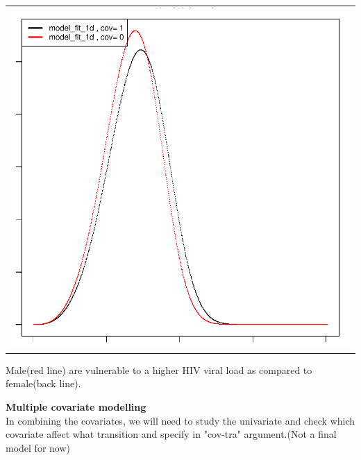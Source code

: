\documentclass[11pt,a4paper]{article}
\begin{document}
\begin{enumerate}
\begin{minipage}{0.45\textwidth}
\begin{tabular}{|p{\textwidth}}
\includegraphics{SemiMarkov_Paper-021}
\end{tabular}
\end{minipage}%
\end{enumerate}

Male(red line) are vulnerable to a higher HIV viral load as compared to female(back line). 


\textbf{Multiple covariate modelling}\\

In combining the covariates, we will need to study the univariate and check which covariate affect what transition and specify in "cov-tra" argument.(Not a final model for now)\\
\end{document}
